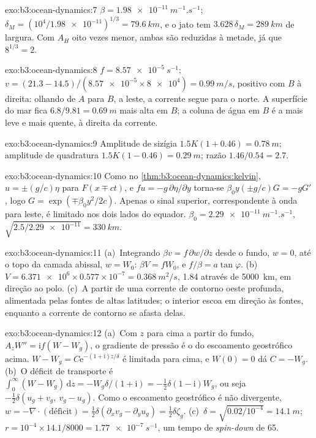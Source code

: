 \begin{solution}{exo:b3:ocean-dynamics:7}
$\beta = \qty{1.98e-11}{m^{-1}.s^{-1}}$; $\delta_M = (10^4/\num{1.98e-11})^{1/3}
= \qty{79.6}{km}$, e o jato tem $3.628\,\delta_M = \qty{289}{km}$ de largura.
Com $A_H$ oito vezes menor, ambas são reduzidas à metade, já que $8^{1/3} = 2$.
\end{solution}

\begin{solution}{exo:b3:ocean-dynamics:8}
$f = \qty{8.57e-5}{s^{-1}}$; $v = (21.3 - 14.5)/(\num{8.57e-5}\times\num{8e4})
= \qty{0.99}{m/s}$, positivo com $B$ à direita: olhando de $A$ para $B$,
a leste, a corrente segue para o norte. A superfície do mar fica
$6.8/9.81 = \qty{0.69}{m}$ mais alta em $B$; a coluna de água em $B$ é a
mais leve e mais quente, à direita da corrente.
\end{solution}

\begin{solution}{exo:b3:ocean-dynamics:9}
Amplitude de sizígia $1.5K(1 + 0.46) = \qty{0.78}{m}$; amplitude de quadratura $1.5K(1 - 0.46)
= \qty{0.29}{m}$; razão $1.46/0.54 = 2.7$.
\end{solution}

\begin{solution}{exo:b3:ocean-dynamics:10}
Como no \cref{thm:b3:ocean-dynamics:kelvin}, $u = \pm(g/c)\eta$ para $F(x \mp
ct)$, e $fu = -g\,\partial\eta/\partial y$ torna-se $\beta_0y(\pm g/c)G =
-gG'$, logo $G = \exp(\mp\beta_0y^2/2c)$. Apenas o sinal superior, correspondente à
onda para leste, é limitado nos dois lados do equador. $\beta_0 =
\qty{2.29e-11}{m^{-1}.s^{-1}}$, $\sqrt{2.5/\num{2.29e-11}} = \qty{330}{km}$.
\end{solution}

\begin{solution}{exo:b3:ocean-dynamics:11}
(a)~Integrando $\beta v = f\,\partial w/\partial z$ desde o fundo, $w = 0$,
até o topo da camada abissal, $w = W_0$: $\beta V = fW_0$, e $f/\beta =
a\tan\varphi$. (b)~$V = \num{6.371e6}\times0.577\times10^{-7} =
\qty{0.368}{m^2/s}$, \qty{1.84}{\sverdrup} através de \qty{5000}{km}, em direção ao polo.
(c)~A partir de uma corrente de contorno oeste profunda, alimentada pelas fontes de altas latitudes;
o interior escoa em direção às fontes, enquanto a corrente de contorno se afasta
delas.
\end{solution}

\begin{solution}{exo:b3:ocean-dynamics:12}
(a)~Com $z$ para cima a partir do fundo, $A_zW'' = \mathrm if(W - W_g)$, o
gradiente de pressão é o do escoamento geostrófico acima. $W - W_g =
C\mathrm e^{-(1+\mathrm i)z/\delta}$ é limitada para cima, e $W(0) = 0$ dá
$C = -W_g$. (b)~O déficit de transporte é $\int_0^\infty(W - W_g)\,\mathrm dz
= -W_g\delta/(1+\mathrm i) = -\tfrac12\delta(1 - \mathrm i)W_g$, ou seja
$-\tfrac12\delta(u_g + v_g,\ v_g - u_g)$. Como o escoamento geostrófico é
não divergente, $w = -\nabla\cdot(\text{déficit}) = \tfrac12\delta(\partial_x
v_g - \partial_y u_g) = \tfrac12\delta\zeta_g$. (c)~$\delta =
\sqrt{0.02/10^{-4}} = \qty{14.1}{m}$; $r = 10^{-4}\times14.1/8000 =
\qty{1.77e-7}{s^{-1}}$, um tempo de \textit{spin-down} de \num{65}.
\end{solution}


